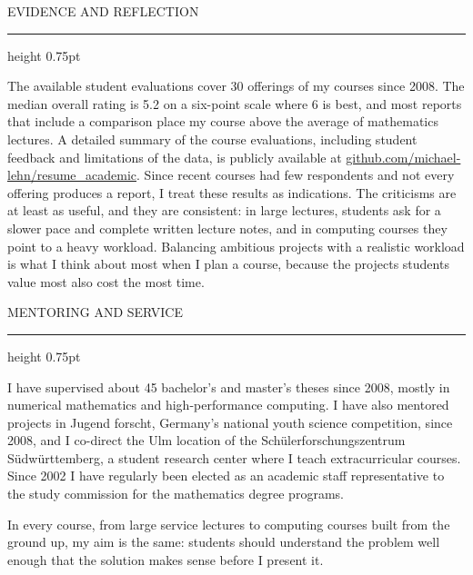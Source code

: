 \documentclass[10pt]{article}
\newcommand{\headsize}{\fontsize{10.5pt}{12.8pt}\selectfont}
\newcommand{\cvsection}[1]{%
  \par\vspace{8pt}%
  {\headsize\bfseries\color{heading}\strut#1\par}%
  \nopagebreak\vspace{1pt}%
  {\color{rule}\hrule height 0.75pt}%
  \nopagebreak\vspace{3pt}%
  \prevdepth=2.9pt\relax
}
\begin{document}
\cvsection{EVIDENCE AND REFLECTION}

The available student evaluations cover 30 offerings of my courses since 2008. The median overall rating is 5.2 on a six-point scale where 6 is best, and most reports that include a comparison place my course above the average of mathematics lectures. A detailed summary of the course evaluations, including student feedback and limitations of the data, is publicly available at \href{https://github.com/michael-lehn/resume_academic}{github.com/michael-lehn/resume\_academic}. Since recent courses had few respondents and not every offering produces a report, I treat these results as indications. The criticisms are at least as useful, and they are consistent: in large lectures, students ask for a slower pace and complete written lecture notes, and in computing courses they point to a heavy workload. Balancing ambitious projects with a realistic workload is what I think about most when I plan a course, because the projects students value most also cost the most time.

\cvsection{MENTORING AND SERVICE}

I have supervised about 45 bachelor's and master's theses since 2008, mostly in numerical mathematics and high-performance computing. I have also mentored projects in Jugend forscht, Germany's national youth science competition, since 2008, and I co-direct the Ulm location of the Schülerforschungszentrum Südwürttemberg, a student research center where I teach extracurricular courses. Since 2002 I have regularly been elected as an academic staff representative to the study commission for the mathematics degree programs.

In every course, from large service lectures to computing courses built from the ground up, my aim is the same: students should understand the problem well enough that the solution makes sense before I present it.
\end{document}
